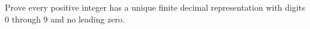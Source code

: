 Prove every positive integer has a unique finite decimal representation with digits 0 through 9 and no leading zero.

